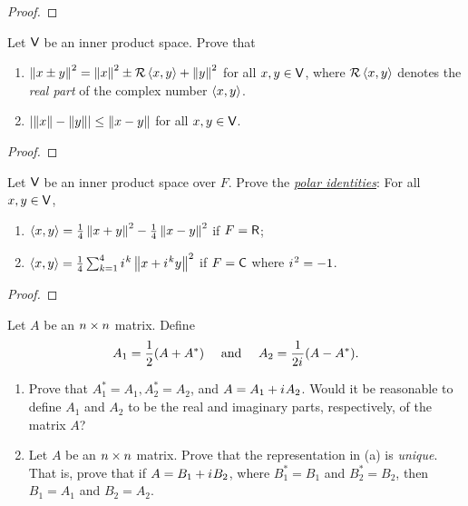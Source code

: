 \begin{proof}
\end{proof}

\begin{exercise} \label{exercise 6.1.19}
Let \(\textsf{V}\) be an inner product space.
Prove that
\begin{enumerate}
\item \(\left\lVert x \pm y\right\rVert^2 = \left\lVert x\right\rVert^2 \pm \mathcal{R}\left< x,y \right> + \left\lVert y\right\rVert^2\) for all \(x, y \in \textsf{V}\), where \(\mathcal{R}\left< x,y \right>\) denotes the \emph{real part} of the complex number \(\left< x, y \right>\).
\item \(\left| \left\lVert x\right\rVert - \left\lVert y\right\rVert \right| \le \left\lVert x- y\right\rVert\) for all \(x, y \in \textsf{V}\).
\end{enumerate}
\end{exercise}

\begin{proof}
\end{proof}

\begin{exercise} \label{exercise 6.1.20}
Let \(\textsf{V}\) be an inner product space over \(F\).
Prove the \emph{\href{https://www.wikiwand.com/en/Polarization_identity}{polar identities}}:
For all \(x, y \in \textsf{V}\),
\begin{enumerate}
\item \(\left< x, y \right> = \frac{1}{4} \left\lVert x + y\right\rVert^2 - \frac{1}{4} \left\lVert x - y\right\rVert^2\) if \(F = \textsf{R}\);
\item \(\left< x, y \right> = \frac{1}{4} \sum_{k = 1}^4 {i\mkern1mu}^k \left\lVert x + {i\mkern1mu}^k y\right\rVert^2\) if \(F = \textsf{C}\) where \({i\mkern1mu}^2 = -1\).
\end{enumerate}
\end{exercise}

\begin{proof}
\end{proof}

\begin{exercise} \label{exercise 6.1.21}
Let \(A\) be an \(n \times n\) matrix.
Define
\[
    A_1 = \frac{1}{2} (A + A^*) \quad \text{ and } \quad A_2 = \frac{1}{2{i\mkern1mu}} (A - A^*).
\]
\begin{enumerate}
\item Prove that \(A_1^* = A_1, A_2^* = A_2\), and \(A = A_1 + {i\mkern1mu} A_2\).
Would it be reasonable to define \(A_1\) and \(A_2\) to be the real and imaginary parts, respectively, of the matrix \(A\)?
\item Let \(A\) be an \(n \times n\) matrix.
Prove that the representation in (a) is \emph{unique}.
That is, prove that if \(A = B_1 + {i\mkern1mu} B_2\), where \(B_1^* = B_1\) and \(B_2^* = B_2\), then \(B_1 = A_1\) and \(B_2 = A_2\).
\end{enumerate}
\end{exercise}

